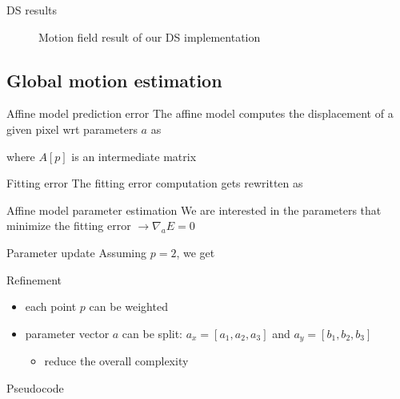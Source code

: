 \documentclass[aspectratio=1610,xcolor=dvipsnames]{beamer}
\begin{document}
\begin{frame}{DS results}
\begin{figure}[H]
\begin{minipage}[b]{0.45\textwidth}
            \label{fig:bbme-3-res}
		\end{minipage}
        \label{fig:bbme-3}
        \caption{Motion field result of our DS implementation}
	\end{figure}
\end{frame}

\subsection{Global motion estimation}
\begin{frame}{Affine model prediction error}
    The affine model computes the displacement of a given pixel wrt parameters \(a\) as
    
    where \(A[p]\) is an intermediate matrix
    
    \begin{block}{Fitting error}
        The fitting error computation gets rewritten as
        
    \end{block}
\end{frame}

\begin{frame}{Affine model parameter estimation}
    We are interested in the parameters that minimize the fitting error \(\to \nabla_a E = 0\)
    \begin{block}{Parameter update}
        Assuming \(p = 2\), we get
        
    \end{block}
    \begin{exampleblock}{Refinement}
        \begin{itemize}
            \item each point \(p\) can be weighted
            \item parameter vector \(a\) can be split: \(a_x = [a_1,a_2,a_3]\) and \(a_y = [b_1,b_2,b_3]\)
            \begin{itemize}
                \item reduce the overall complexity
            \end{itemize}
        \end{itemize}
        
    \end{exampleblock}
\end{frame}

\begin{frame}{Pseudocode}
     
\end{frame}
\end{document}
